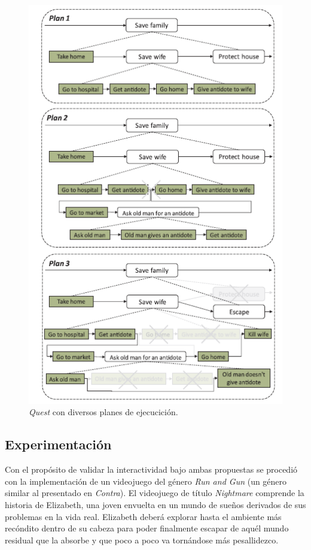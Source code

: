 \documentclass[conference]{IEEEtran}
\begin{document}
\begin{figure}[tph!]
\centerline{\includegraphics[totalheight=12cm]{7}}
    \caption{ \textit{Quest} con diversos planes de ejecucición. }
\end{figure}

\medskip
\subsection{Experimentación}
Con el propósito de validar la interactividad bajo ambas propuestas se procedió con la implementación de un videojuego del género \textit{Run and Gun} (un género similar al presentado en \textit{Contra}). El videojuego de título \textit{Nightmare} comprende la historia de Elizabeth, una joven envuelta en un mundo de sueños derivados de sus problemas en la vida real. Elizabeth deberá explorar hasta el ambiente más recóndito dentro de su cabeza para poder finalmente escapar de aquél mundo residual que la absorbe y que poco a poco va tornándose más pesallidezco.
\end{document}
